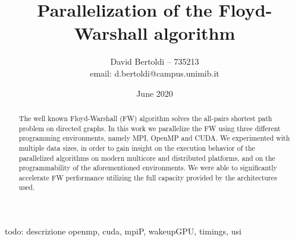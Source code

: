 \documentclass[compsoc]{IEEEtran}
\title{Parallelization of the Floyd-Warshall algorithm}
\author{David Bertoldi -- 735213 \\ email: d.bertoldi@campus.unimib.it}
\affil{Department of Informatics, Systems and Communication}
\affil{University of Milano-Bicocca}
\date{June 2020}
\begin{document}
\maketitle 



\begin{abstract}
The well known Floyd-Warshall (FW) algorithm solves the all-pairs shortest path problem on directed graphs. In this work we parallelize the FW using three different
programming environments, namely MPI, OpenMP and CUDA. We experimented with multiple data sizes, in order to gain insight on the execution behavior
of the parallelized algorithms on modern multicore and distributed platforms, and on the programmability of the aforementioned environments. We were able
to significantly accelerate FW performance utilizing the full capacity provided by the architectures used.
\end{abstract}

todo: descrizione openmp, cuda, mpiP, wakeupGPU, timings, usi








\end{document}
